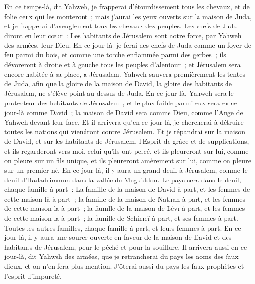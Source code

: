 \begin{multicols}{2}
En ce temps-là, dit Yahweh, je frapperai d'étourdissement tous les chevaux, et de folie ceux qui les monteront~; mais j'aurai les yeux ouverts sur la maison de Juda, et je frapperai d'aveuglement tous les chevaux des peuples.
Les chefs de Juda diront en leur cœur~: Les habitants de Jérusalem sont notre force, par Yahweh des armées, leur Dieu.
En ce jour-là, je ferai des chefs de Juda comme un foyer de feu parmi du bois, et comme une torche enflammée parmi des gerbes~; ils dévoreront à droite et à gauche tous les peuples d'alentour~; et Jérusalem sera encore habitée à sa place, à Jérusalem.
Yahweh sauvera premièrement les tentes de Juda, afin que la gloire de la maison de David, la gloire des habitants de Jérusalem, ne s'élève point au-dessus de Juda.
En ce jour-là, Yahweh sera le protecteur des habitants de Jérusalem~; et le plus faible parmi eux sera en ce jour-là comme David~; la maison de David sera comme Dieu, comme l'Ange de Yahweh devant leur face.
Et il arrivera qu'en ce jour-là, je chercherai à détruire toutes les nations qui viendront contre Jérusalem.
Et je répandrai sur la maison de David, et sur les habitants de Jérusalem, l'Esprit de grâce et de supplications, et ils regarderont vers moi, celui qu'ils ont percé, et ils pleureront sur lui, comme on pleure sur un fils unique, et ils pleureront amèrement sur lui, comme on pleure sur un premier-né.
En ce jour-là, il y aura un grand deuil à Jérusalem, comme le deuil d'Hadadrimmon dans la vallée de Meguiddon.
Le pays sera dans le deuil, chaque famille à part~: La famille de la maison de David à part, et les femmes de cette maison-là à part~; la famille de la maison de Nathan à part, et les femmes de cette maison-là à part~;
la famille de la maison de Lévi à part, et les femmes de cette maison-là à part~; la famille de Schimeï à part, et ses femmes à part.
Toutes les autres familles, chaque famille à part, et leurs femmes à part.
\VerseOne{}En ce jour-là, il y aura une source ouverte en faveur de la maison de David et des habitants de Jérusalem, pour le péché et pour la souillure.
Il arrivera aussi en ce jour-là, dit Yahweh des armées, que je retrancherai du pays les noms des faux dieux, et on n'en fera plus mention. J'ôterai aussi du pays les faux prophètes et l'esprit d'impureté.

\end{multicols}
